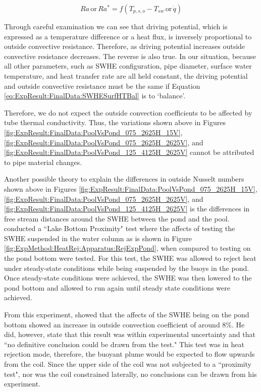 \begin{equation}
	Ra \, \mbox{or} \, Ra^* = f(T_{p,s,o}-T_{sw} \, \mbox{or} \, \dot{q})
	\label{eq:ExpResult:FinalData:TempDiff}
\end{equation}

Through careful examination we can see that driving potential, which is expressed as a temperature difference or a heat flux, is inversely proportional to outside convective resistance. Therefore, as driving potential increases outside convective resistance decreases. The reverse is also true. In our situation, because all other parameters, such as SWHE configuration, pipe diameter, surface water temperature, and heat transfer rate are all held constant, the driving potential and outside convective resistance must be the same if Equation \ref{eq:ExpResult:FinalData:SWHESurfHTBal} is to `balance'.

Therefore, we do not expect the outside convection coefficients to be affected by tube thermal conductivity. Thus, the variations shown above in Figures \ref{fig:ExpResult:FinalData:PoolVsPond_075_2625H_15V}, \ref{fig:ExpResult:FinalData:PoolVsPond_075_2625H_2625V}, and \ref{fig:ExpResult:FinalData:PoolVsPond_125_4125H_2625V} cannot be attributed to pipe material changes.

Another possible theory to explain the differences in outside Nusselt numbers shown above in Figures \ref{fig:ExpResult:FinalData:PoolVsPond_075_2625H_15V}, \ref{fig:ExpResult:FinalData:PoolVsPond_075_2625H_2625V}, and \ref{fig:ExpResult:FinalData:PoolVsPond_125_4125H_2625V} is the differences in free stream distances around the SWHE between the pond and the pool. \cite{Hansen2011} conducted a ``Lake Bottom Proximity" test where the affects of testing the SWHE suspended in the water column as is shown in Figure \ref{fig:ExpMethod:HeatRej:Apparatus:RejExpPond}, when compared to testing on the pond bottom were tested. For this test, the SWHE was allowed to reject heat under steady-state conditions while being suspended by the buoys in the pond. Once steady-state conditions were achieved, the SWHE was then lowered to the pond bottom and allowed to run again until steady state conditions were achieved.

From this experiment, \cite{Hansen2011} showed that the affects of the SWHE being on the pond bottom showed an increase in outside convection coefficient of around 8\%. He did, however, state that this result was within experimental uncertainty and that ``no definitive conclusion could be drawn from the test." This test was in heat rejection mode, therefore, the buoyant plume would be expected to flow upwards from the coil. Since the upper side of the coil was not subjected to a ``proximity test", nor was the coil constrained laterally, no conclusions can be drawn from his experiment.

